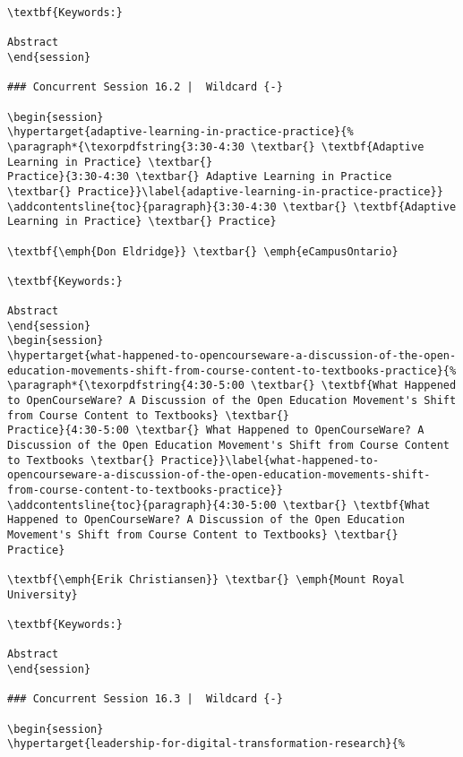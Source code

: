 \documentclass[
]{book}
\begin{document}
\begin{verbatim}
\textbf{Keywords:}

Abstract
\end{session}

### Concurrent Session 16.2 |  Wildcard {-}

\begin{session}
\hypertarget{adaptive-learning-in-practice-practice}{%
\paragraph*{\texorpdfstring{3:30-4:30 \textbar{} \textbf{Adaptive
Learning in Practice} \textbar{}
Practice}{3:30-4:30 \textbar{} Adaptive Learning in Practice \textbar{} Practice}}\label{adaptive-learning-in-practice-practice}}
\addcontentsline{toc}{paragraph}{3:30-4:30 \textbar{} \textbf{Adaptive
Learning in Practice} \textbar{} Practice}

\textbf{\emph{Don Eldridge}} \textbar{} \emph{eCampusOntario}

\textbf{Keywords:}

Abstract
\end{session}
\begin{session}
\hypertarget{what-happened-to-opencourseware-a-discussion-of-the-open-education-movements-shift-from-course-content-to-textbooks-practice}{%
\paragraph*{\texorpdfstring{4:30-5:00 \textbar{} \textbf{What Happened
to OpenCourseWare? A Discussion of the Open Education Movement's Shift
from Course Content to Textbooks} \textbar{}
Practice}{4:30-5:00 \textbar{} What Happened to OpenCourseWare? A Discussion of the Open Education Movement's Shift from Course Content to Textbooks \textbar{} Practice}}\label{what-happened-to-opencourseware-a-discussion-of-the-open-education-movements-shift-from-course-content-to-textbooks-practice}}
\addcontentsline{toc}{paragraph}{4:30-5:00 \textbar{} \textbf{What
Happened to OpenCourseWare? A Discussion of the Open Education
Movement's Shift from Course Content to Textbooks} \textbar{} Practice}

\textbf{\emph{Erik Christiansen}} \textbar{} \emph{Mount Royal
University}

\textbf{Keywords:}

Abstract
\end{session}

### Concurrent Session 16.3 |  Wildcard {-}

\begin{session}
\hypertarget{leadership-for-digital-transformation-research}{%

\end{verbatim}
\end{document}
